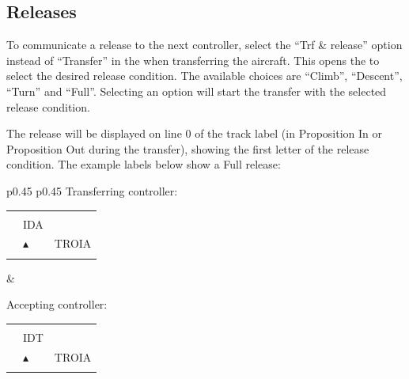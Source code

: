 \documentclass[a4paper,oneside,11pt]{memoir}
\newcommand{\colorref}[1]{\colorbox{Flight Highlight}{\color{#1}#1}}
\newcommand{\winref}[1]{\textit{\titleref{#1}}}
\begin{document}
\subsection{Releases}

To communicate a release to the next controller, select the “Trf \& release” option instead of “Transfer” in the \winref{menu:cs} when transferring the aircraft. This opens the \winref{menu:xfrrel} to select the desired release condition. The available choices are “Climb”, “Descent”, “Turn” and “Full”. Selecting an option will start the transfer with the selected release condition.

\bigskip

The release will be displayed on line 0 of the track label (in \colorref{Proposition In} or \colorref{Proposition Out} during the transfer), showing the first letter of the release condition. The example labels below show a Full release:

\bigskip

\begin{longtable}{p{} p{}}
  Transferring controller:

\begin{tabular}{
  >{\columncolor{Flight Highlight}}l 
  >{\columncolor{Flight Highlight}}l
  >{\columncolor{Flight Highlight}}l }
  {\color{Proposition In} F} & {\color{Coordination} }       & {\color{Assumed} }      \\
  {\color{Proposition In} ABC123} & {\color{Proposition In} IDA}       & {\color{Assumed} }      \\
  {\color{Assumed} 100}    & {\color{Assumed} $\blacktriangle$} & {\color{Assumed} TROIA} \\
  {\color{Assumed} 180}    & {\color{Assumed} }          & {\color{Assumed} }     
\end{tabular}
&

  Accepting controller:

\begin{tabular}{
  >{\columncolor{Flight Highlight}}l 
  >{\columncolor{Flight Highlight}}l
  >{\columncolor{Flight Highlight}}l }
  {\color{Proposition In} F} & {\color{Coordination} }       & {\color{Assumed} }      \\
  {\color{Assumed} ABC123} & {\color{Assumed} IDT}       & {\color{Coordination} }      \\
  {\color{Coordination} 100}    & {\color{Coordination} $\blacktriangle$} & {\color{Coordination} TROIA} \\
  {\color{Coordination} 180}    & {\color{Coordination} }          & {\color{Coordination} }     
\end{tabular}
\end{longtable}
\end{document}
